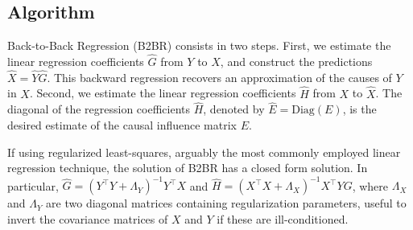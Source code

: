 \documentclass{article}
\begin{document}




\subsection{Algorithm}


Back-to-Back Regression (B2BR) consists in two steps.
%
First, we estimate the linear regression coefficients $\hat G$ from $Y$ to $X$, and construct the predictions $\hat X = \hat Y \hat G$.
%
This backward regression recovers an approximation of the causes of $Y$ in $X$.
%
Second, we estimate the linear regression coefficients $\hat H$ from $X$ to $\hat X$.
%
The diagonal of the regression coefficients $\hat H$, denoted by $\hat{E} = \text{Diag}(E)$, is the desired estimate of the causal influence matrix $E$.

If using regularized least-squares, arguably the most commonly employed linear regression technique, the solution of B2BR has a closed form solution.
%
In particular, $\hat G = (Y^\top Y + \Lambda_Y)^{-1} Y^\top X$ and $\hat H=(X^\top X + \Lambda_X)^{-1} X^\top YG$, where $\Lambda_X$ and $\Lambda_Y$ are two diagonal matrices containing regularization parameters, useful to invert the covariance matrices of $X$ and $Y$ if these are ill-conditioned.


 
\end{document}
